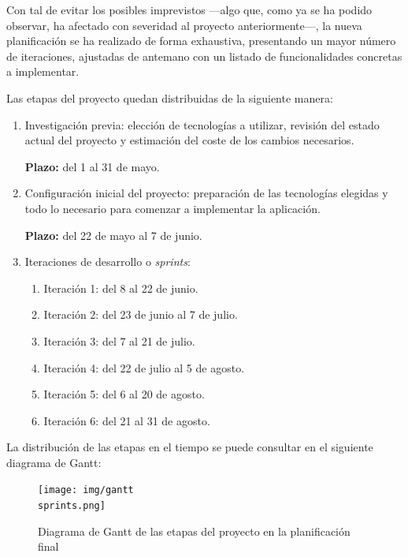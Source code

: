 \documentclass[10pt, a4paper]{aqademic}
\begin{document}
Con tal de evitar los posibles imprevistos ---algo que, como ya se ha podido observar, ha afectado con severidad al proyecto anteriormente---, la nueva planificación se ha realizado de forma exhaustiva, presentando un mayor número de iteraciones, ajustadas de antemano con un listado de funcionalidades concretas a implementar.

Las etapas del proyecto quedan distribuidas de la siguiente manera:

\begin{enumerate}
	\item Investigación previa: elección de tecnologías a utilizar, revisión del estado actual del proyecto y estimación del coste de los cambios necesarios.
	
	\textbf{Plazo:} del 1 al 31 de mayo. 
	
	\item Configuración inicial del proyecto: preparación de las tecnologías elegidas y todo lo necesario para comenzar a implementar la aplicación.
	
	\textbf{Plazo:} del 22 de mayo al 7 de junio.
	
	\item Iteraciones de desarrollo o \textit{sprints}: 
	\begin{enumerate}
		\item Iteración 1: del 8 al 22 de junio.
		
		\item Iteración 2: del 23 de junio al  7 de julio.
		
		\item Iteración 3: del 7 al 21 de julio.
		
		\item Iteración 4: del 22 de julio al 5 de agosto.
		
		\item Iteración 5: del 6 al 20 de agosto.
		
		\item Iteración 6: del 21 al 31 de agosto.
	\end{enumerate}
\end{enumerate}

La distribución de las etapas en el tiempo se puede consultar en el siguiente diagrama de Gantt:

\medskip

\begin{figure}[h]
	\centering
	\texttt{[image: img/gantt\\ sprints.png]}
	\caption{Diagrama de Gantt de las etapas del proyecto en la planificación final}
\end{figure}
\end{document}
